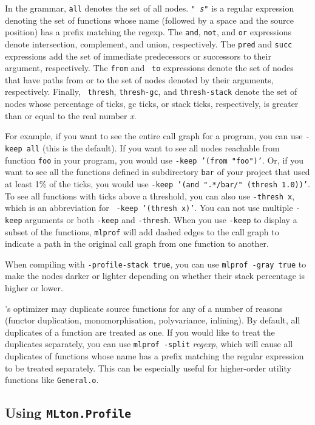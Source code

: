 In the grammar, {\tt all} denotes the set of all nodes.  {\tt "{\it
s}"} is a regular expression denoting the set of functions whose name
(followed by a space and the source position) has a prefix matching
the regexp.  The {\tt and}, {\tt not}, and {\tt or} expressions denote
intersection, complement, and union, respectively.  The {\tt pred} and
{\tt succ} expressions add the set of immediate predecessors or
successors to their argument, respectively.  The {\tt from} and {\tt
to} expressions denote the set of nodes that have paths from or to the
set of nodes denoted by their arguments, respectively.  Finally, {\tt
thresh}, {\tt thresh-gc}, and {\tt thresh-stack} denote the set of
nodes whose percentage of ticks, gc ticks, or stack ticks,
respectively, is greater than or equal to the real number {\it x}.

For example, if you want to see the entire call graph for a program,
you can use {\tt -keep all} (this is the default).  If you want to see
all nodes reachable from function {\tt foo} in your program, you would
use {\tt -keep '(from "foo")'}.  Or, if you want to see all the
functions defined in subdirectory {\tt bar} of your project that used
at least 1\% of the ticks, you would use {\tt -keep '(and ".*/bar/"
(thresh 1.0))'}.  To see all functions with ticks above a threshold,
you can also use {\tt -thresh x}, which is an abbreviation for {\tt
-keep '(thresh x)'}.  You can not use multiple {\tt -keep} arguments
or both {\tt -keep} and {\tt -thresh}.  When you use {\tt -keep} to
display a subset of the functions, {\tt mlprof} will add dashed edges
to the call graph to indicate a path in the original call graph from
one function to another.

When compiling with {\tt -profile-stack true}, you can use {\tt mlprof
-gray true} to make the nodes darker or lighter depending on whether
their stack percentage is higher or lower.

{\mlton}'s optimizer may duplicate source functions for any of a
number of reasons (functor duplication, monomorphisation,
polyvariance, inlining).  By default, all duplicates of a function are
treated as one.  If you would like to treat the duplicates separately,
you can use {\tt mlprof -split} {\it regexp}, which will cause all
duplicates of functions whose name has a prefix matching the regular
expression to be treated separately.  This can be especially useful
for higher-order utility functions like {\tt General.o}.
%
\subsection{Using {\tt MLton.Profile}}

